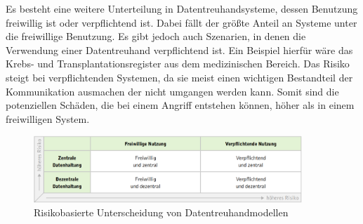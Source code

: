 \documentclass[11pt,a4paper]{scrreprt}
\begin{document}
Es besteht eine weitere Unterteilung in Datentreuhandsysteme, dessen Benutzung freiwillig ist oder verpflichtend ist. Dabei fällt der größte Anteil an Systeme unter die freiwillige Benutzung. Es gibt jedoch auch Szenarien, in denen die Verwendung einer Datentreuhand verpflichtend ist. Ein Beispiel hierfür wäre das Krebs- und Transplantationsregister aus dem medizinischen Bereich. Das Risiko steigt bei verpflichtenden Systemen, da sie meist einen wichtigen Bestandteil der Kommunikation ausmachen der nicht umgangen werden kann. Somit sind die potenziellen Schäden, die bei einem Angriff entstehen können, höher als in einem freiwilligen System.

\begin{figure}
    \centering
    \includegraphics[width=0.9\textwidth]{DT-RisikoEinteilung.png}
    \caption{Risikobasierte Unterscheidung von Datentreuhandmodellen \cite{dt-blankertz2021neue}}
    \label{fig:dt-risikoeinteilug}
\end{figure}
\end{document}
